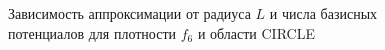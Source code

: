 \documentclass[a4paper, 12pt]{article}
\begin{document}
              \begin{figure}[h!]
                \noindent{}
                \caption{Зависимость аппроксимации от радиуса $L$ и числа базисных потенциалов для плотности $f_6$ и области CIRCLE}
                \label{nolnol}
                \end{figure} 
\end{document}
